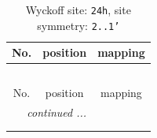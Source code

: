 \documentclass[fleqn,8pt]{jsarticle}
\begin{document}
\renewcommand{\arraystretch}{1.2}
\begin{longtable}{ccc}
\caption{Wyckoff site: {\tt 24h}, site symmetry: {\tt 2..1'}}
 \\
 \hline \hline
No. & position & mapping \\ \hline \endfirsthead

\multicolumn{2}{l}{\tablename\ \thetable{}} \\
 \hline \hline
No. & position & mapping \\ \hline \endhead

 \hline \hline
\multicolumn{2}{r}{\footnotesize\it continued ...} \\ \endfoot

 \hline \hline
\multicolumn{2}{r}{} \\ \endlastfoot


\end{longtable}
\end{document}

